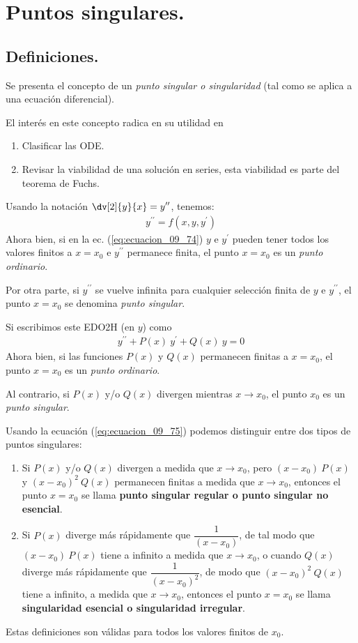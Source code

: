 \section{Puntos singulares.}
\subsection{Definiciones.}
Se presenta el concepto de un \emph{punto singular o singularidad} (tal como se aplica a una ecuación diferencial).
\par
El interés en este concepto radica en su utilidad en
\begin{enumerate}
\item Clasificar las ODE.
\item Revisar la viabilidad de una solución en series, esta viabilidad es parte del teorema de Fuchs.
\end{enumerate}
Usando la notación $\displaystyle \dv[2]{y}{x} = y^{\prime \prime}$, tenemos:
\begin{align}
y^{\prime \prime} = f(x, y, y^{\prime})
\label{eq:ecuacion_09_74}
\end{align}
Ahora bien, si en la ec. (\ref{eq:ecuacion_09_74}) $y$ e $y^{\prime}$ pueden tener todos los valores finitos a $x = x_{0}$ e $y^{\prime \prime}$ permanece finita, el punto $x = x_{0}$ es un \emph{punto ordinario}.

Por otra parte, si $y^{\prime \prime}$ se vuelve infinita para cualquier selección finita de $y$ e  $y^{\prime \prime}$, el punto $x = x_{0}$ se denomina \emph{punto singular}.

Si escribimos este EDO2H (en $y$) como
\begin{align}
y^{\prime \prime} + P(x) \: y^{\prime} + Q(x) \: y = 0
\label{eq:ecuacion_09_75}
\end{align}
Ahora bien, si las funciones $P(x)$ y $Q(x)$ permanecen finitas a $x = x_{0}$, el punto $x = x_{0}$ es un \emph{punto ordinario}.

Al contrario, si $P(x)$ y/o $Q(x)$ divergen mientras $x \to x_{0}$, el punto $x_{0}$ es un \emph{punto singular}.

Usando la ecuación (\ref{eq:ecuacion_09_75}) podemos distinguir entre dos tipos de puntos singulares:
\begin{enumerate}
\item Si $P(x)$ y/o $Q(x)$ divergen a medida que $x \to x_{0}$, pero $(x - x_{0}) \: P(x)$ y $(x - x_{0})^{2} \: Q(x)$ permanecen finitas a medida que $x \to x_{0}$, entonces el punto $x = x_{0}$ se llama \textbf{punto singular regular o punto singular no esencial}.
\item Si $P(x)$ diverge más rápidamente que $\dfrac{1}{(x - x_{0})}$, de tal modo que $(x - x_{0}) \: P(x)$ tiene a infinito a medida que $x \to x_{0}$, o cuando $Q(x)$ diverge más rápidamente que $\dfrac{1}{(x - x_{0})^{2}}$, de modo que $(x - x_{0})^{2} \: Q(x)$ tiene a infinito, a medida que $x \to x_{0}$, entonces el punto $x = x_{0}$ se llama \textbf{singularidad esencial o singularidad irregular}.
\end{enumerate}
Estas definiciones son válidas para todos los valores finitos de $x_{0}$. 

